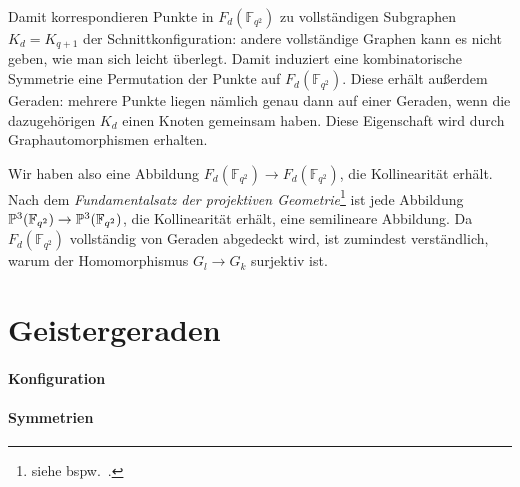 Damit korrespondieren Punkte in $F_d(\mathbb F_{q^2})$ zu vollständigen Subgraphen $K_d = K_{q+1}$ der Schnittkonfiguration: andere vollständige Graphen kann es nicht geben, wie man sich leicht überlegt. Damit induziert eine kombinatorische Symmetrie eine Permutation der Punkte auf $F_d(\mathbb F_{q^2})$. Diese erhält außerdem Geraden: mehrere Punkte liegen nämlich genau dann auf einer Geraden, wenn die dazugehörigen $K_d$ einen Knoten gemeinsam haben. Diese Eigenschaft wird durch Graphautomorphismen erhalten.

Wir haben also eine Abbildung $F_d(\mathbb F_{q^2}) \to F_d(\mathbb F_{q^2})$, die Kollinearität erhält. Nach dem \emph{Fundamentalsatz der projektiven Geometrie}\footnote{siehe bspw.~\cite[S.~72]{Dieudonne}.} ist jede Abbildung $\mathbb P^{3}(\mathbb F_{q^2}) \rightarrow \mathbb P^{3}(\mathbb F_{q^2})$, die Kollinearität erhält, eine semilineare Abbildung. Da $F_d(\mathbb F_{q^2})$ vollständig von Geraden abgedeckt wird, ist zumindest verständlich, warum der Homomorphismus $G_l \to G_k$ surjektiv ist.

\section{Geistergeraden}
\paragraph{Konfiguration}
\paragraph{Symmetrien}
